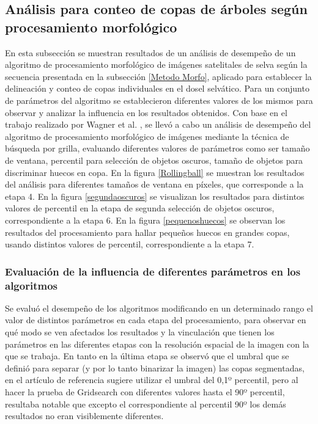 \subsection{Análisis para conteo de copas de árboles según procesamiento morfológico} \label{resultados morfologico}
En esta subsección se muestran resultados de un análisis de desempeño de un algoritmo de procesamiento morfológico de imágenes satelitales de selva según la secuencia presentada en la subsección \ref{Metodo Morfo}, aplicado para establecer la delineación y conteo de copas individuales en el dosel selvático. Para un conjunto de parámetros del algoritmo se establecieron diferentes valores de los mismos para observar y analizar la influencia en los resultados obtenidos.
Con base en el trabajo realizado por Wagner et al. \cite{hubert_wagner_individual_2018}, se llevó a cabo un análisis de desempeño del algoritmo de procesamiento morfológico de imágenes mediante la técnica de búsqueda por grilla, evaluando diferentes valores de parámetros como ser tamaño de ventana, percentil para selección de objetos oscuros, tamaño de objetos para discriminar huecos en copa. En la figura \ref{Rollingball} se muestran los resultados del análisis para diferentes tamaños de ventana en  píxeles, que corresponde a la etapa 4. En la figura \ref{segundaoscuros} se visualizan los resultados para distintos valores de percentil en la etapa de segunda selección de objetos oscuros, correspondiente a la etapa 6. En la figura \ref{pequenoshuecos} se observan los resultados del procesamiento para hallar pequeños huecos en grandes copas, usando distintos valores de percentil, correspondiente a la etapa 7. 



\subsubsection{Evaluación de la influencia de diferentes parámetros en los algoritmos}
Se evaluó el desempeño de los algoritmos modificando en un determinado rango el valor de distintos parámetros en cada etapa del procesamiento, para observar en qué modo se ven afectados los resultados y la vinculación que tienen los parámetros en las diferentes etapas con la resolución espacial de la imagen con la que se trabaja. En tanto en la última etapa se observó que el umbral
que se definió para separar (y por lo tanto binarizar la imagen) las copas segmentadas, en el artículo de referencia sugiere utilizar el umbral del 0,1º percentil, pero al hacer la prueba de Gridsearch con diferentes valores hasta el 90º percentil, resultaba notable que excepto el correspondiente al percentil 90º los demás resultados no eran visiblemente
diferentes.

